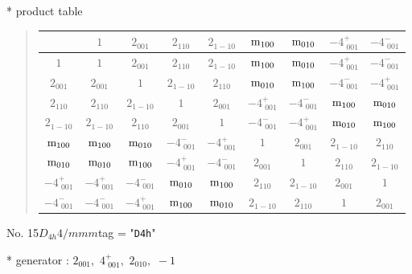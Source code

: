 \documentclass[fleqn,10pt,landscape]{jsarticle}
\begin{document}
* product table
\begin{quote}
\begin{tabular}{ccccccccc} \hline \hline
 & $ 1 $ & $ 2{}_{001} $ & $ 2{}_{110} $ & $ 2{}_{1-10} $ & $ {\rm m}_{100} $ & $ {\rm m}_{010} $ & $ -4^{+}_{\,\,001} $ & $ -4^{-}_{\,\,001} $ \\ \hline
$ 1 $ & $ 1 $ & $ 2{}_{001} $ & $ 2{}_{110} $ & $ 2{}_{1-10} $ & $ {\rm m}_{100} $ & $ {\rm m}_{010} $ & $ -4^{+}_{\,\,001} $ & $ -4^{-}_{\,\,001} $ \\
$ 2{}_{001} $ & $ 2{}_{001} $ & $ 1 $ & $ 2{}_{1-10} $ & $ 2{}_{110} $ & $ {\rm m}_{010} $ & $ {\rm m}_{100} $ & $ -4^{-}_{\,\,001} $ & $ -4^{+}_{\,\,001} $ \\
$ 2{}_{110} $ & $ 2{}_{110} $ & $ 2{}_{1-10} $ & $ 1 $ & $ 2{}_{001} $ & $ -4^{+}_{\,\,001} $ & $ -4^{-}_{\,\,001} $ & $ {\rm m}_{100} $ & $ {\rm m}_{010} $ \\
$ 2{}_{1-10} $ & $ 2{}_{1-10} $ & $ 2{}_{110} $ & $ 2{}_{001} $ & $ 1 $ & $ -4^{-}_{\,\,001} $ & $ -4^{+}_{\,\,001} $ & $ {\rm m}_{010} $ & $ {\rm m}_{100} $ \\
$ {\rm m}_{100} $ & $ {\rm m}_{100} $ & $ {\rm m}_{010} $ & $ -4^{-}_{\,\,001} $ & $ -4^{+}_{\,\,001} $ & $ 1 $ & $ 2{}_{001} $ & $ 2{}_{1-10} $ & $ 2{}_{110} $ \\
$ {\rm m}_{010} $ & $ {\rm m}_{010} $ & $ {\rm m}_{100} $ & $ -4^{+}_{\,\,001} $ & $ -4^{-}_{\,\,001} $ & $ 2{}_{001} $ & $ 1 $ & $ 2{}_{110} $ & $ 2{}_{1-10} $ \\
$ -4^{+}_{\,\,001} $ & $ -4^{+}_{\,\,001} $ & $ -4^{-}_{\,\,001} $ & $ {\rm m}_{010} $ & $ {\rm m}_{100} $ & $ 2{}_{110} $ & $ 2{}_{1-10} $ & $ 2{}_{001} $ & $ 1 $ \\
$ -4^{-}_{\,\,001} $ & $ -4^{-}_{\,\,001} $ & $ -4^{+}_{\,\,001} $ & $ {\rm m}_{100} $ & $ {\rm m}_{010} $ & $ 2{}_{1-10} $ & $ 2{}_{110} $ & $ 1 $ & $ 2{}_{001} $ \\
 \hline \hline
\end{tabular}
\end{quote}

\newpage

No. 15\quad$D_{4h}$\quad$4/mmm$\quad[ tetragonal ]
tag = "{\tt D4h}"

* generator : $2{}_{001},\,\,4^{+}_{\,\,001},\,\,2{}_{010},\,\,-1$
\end{document}
